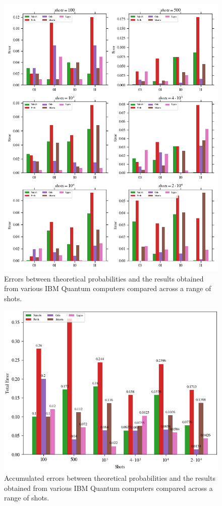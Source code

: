 \begin{figure}[h!]
\centering
\includegraphics[width=\textwidth]{images/quantum_benchmark_error.png}
\caption{Errors between theoretical probabilities and the results obtained from various IBM Quantum computers compared across a range of shots.}
\label{fig:quantum_benchmark_error}
\end{figure}

\begin{figure}[h!]
\centering
\includegraphics[width=\textwidth]{images/quantum_benchmark_total_error.png}
\caption{Accumulated errors between theoretical probabilities and the results obtained from various IBM Quantum computers compared across a range of shots.}
\label{fig:quantum_benchmark_total_error}
\end{figure}

